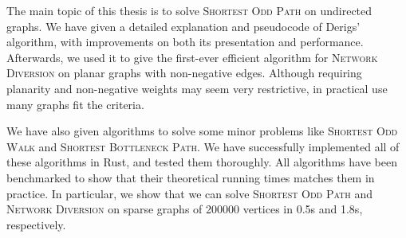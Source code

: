 The main topic of this thesis is to solve \textsc{Shortest Odd Path} on undirected graphs. We have given a detailed explanation and pseudocode of Derigs' \cite{source:derigs_shortest_odd_path} algorithm, with improvements on both its presentation and performance. Afterwards, we used it to give the first-ever efficient algorithm for \textsc{Network Diversion} on planar graphs with non-negative edges. Although requiring planarity and non-negative weights may seem very restrictive, in practical use many graphs fit the criteria.

We have also given algorithms to solve some minor problems like \textsc{Shortest Odd Walk} and \textsc{Shortest Bottleneck Path}. We have successfully implemented all of these algorithms in Rust, and tested them thoroughly. All algorithms have been benchmarked to show that their theoretical running times matches them in practice. In particular, we show that we can solve \textsc{Shortest Odd Path} and \textsc{Network Diversion} on sparse graphs of 200000 vertices in 0.5s and 1.8s, respectively.
